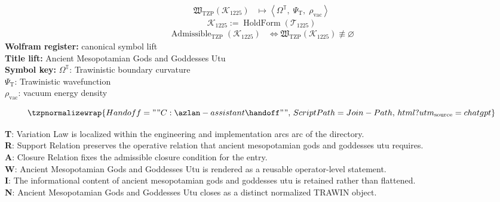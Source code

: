 \noindent
\begin{minipage}[t]{0.48\linewidth}
\begingroup
\small
\[
\begin{aligned}
\mathfrak{W}_{\mathrm{TZP}}\!\left(\mathcal{K}_{1225}\right)
&\longmapsto
\left\langle \Omega^{\mathbb{T}},\; \Psi_{\mathrm{T}},\; \rho_{\mathrm{vac}} \right\rangle
\end{aligned}
\]
\[
\mathcal{K}_{1225}
:=
\operatorname{HoldForm}\!\left(\mathcal{T}_{1225}\right)
\]
\[
\begin{aligned}
\operatorname{Admissible}_{\mathrm{TZP}}\!\left(\mathcal{K}_{1225}\right)
&\Longleftrightarrow
\mathfrak{W}_{\mathrm{TZP}}\!\left(\mathcal{K}_{1225}\right)\not\equiv\varnothing
\end{aligned}
\]
\textbf{Wolfram register:} canonical symbol lift\\
\textbf{Title lift:} Ancient Mesopotamian Gods and Goddesses Utu\\
\textbf{Symbol key:} \(\Omega^{\mathbb{T}}\): Trawinistic boundary curvature\\ \(\Psi_{\mathrm{T}}\): Trawinistic wavefunction\\ \(\rho_{\mathrm{vac}}\): vacuum energy density
\par
\endgroup
\end{minipage}\hfill
\begin{minipage}[t]{0.48\linewidth}
\[
\tzpnormalizewrap{Handoff = ""C:\azlan-assistant\handoff"",\,ScriptPath = Join-Path,\,html?utm_{\mathrm{source}}=chatgpt}
\]

\small
\textbf{T}: Variation Law is localized within the engineering and implementation arcs arc of the directory.\\
\textbf{R}: Support Relation preserves the operative relation that ancient mesopotamian gods and goddesses utu requires.\\
\textbf{A}: Closure Relation fixes the admissible closure condition for the entry.\\
\textbf{W}: Ancient Mesopotamian Gods and Goddesses Utu is rendered as a reusable operator-level statement.\\
\textbf{I}: The informational content of ancient mesopotamian gods and goddesses utu is retained rather than flattened.\\
\textbf{N}: Ancient Mesopotamian Gods and Goddesses Utu closes as a distinct normalized TRAWIN object.
\normalsize
\end{minipage}

